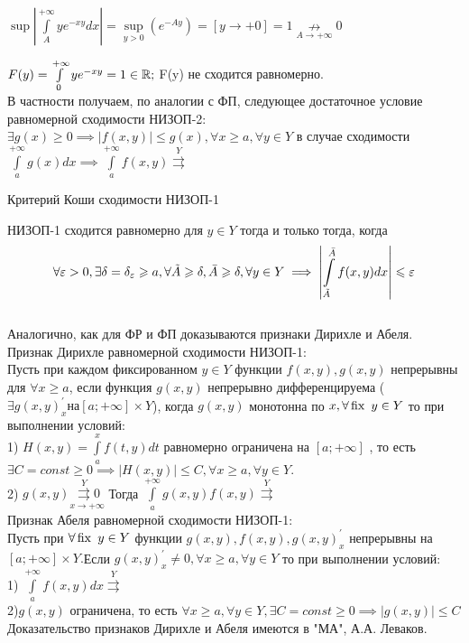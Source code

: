 \documentclass[a4paper,12pt,openany]{report}
\begin{document}
$\sup\left| \int\limits_A^{+\infty}ye^{-xy}dx \right|=\underset{y > 0}\sup  
\left( e^{-Ay}\right) = \left[y \to +0\right] = 1 \underset{A \to 
+\infty}\nrightarrow 0 $	

$F(y) = \int\limits_0^{+\infty}ye^{-xy} = 1 \in \mathbb{R};$ F(y) не сходится 
равномерно.
\\
В частности получаем, по аналогии с ФП, следующее достаточное условие 
равномерной сходимости НИЗОП-2:
$\exists g(x) \ge 0 \implies \left| f(x,y) \right| \le g(x), \forall x \ge a, 
\forall y \in Y $ в случае сходимости $\int\limits_a^{+\infty}g(x)dx \implies 
\int\limits_a^{+\infty}f(x,y) \overset{Y}\rightrightarrows $
\begin{crl*}Критерий Коши сходимости НИЗОП-1\end{crl*}

НИЗОП-1 сходится равномерно для $ y \in Y$ тогда и только тогда, 
когда\begin{equation}\label{lec10:11} \forall \varepsilon > 0, \exists \delta = 
\delta_\varepsilon \geqslant a, \forall \tilde{A} \geqslant \delta, \bar{A} \geqslant \delta, \forall y 
\in Y \implies \left| \int\limits_{\tilde{A}}^{\bar{A}}f(x,y)dx \right| \leqslant 
\varepsilon \end{equation}
\\
Аналогично, как для ФР и ФП доказываются признаки Дирихле и Абеля.
\\
Признак Дирихле равномерной сходимости НИЗОП-1:
\\
Пусть при каждом фиксированном $y \in Y$ функции $f(x,y),g(x,y)$ непрерывны 
для $\forall x \ge a$, если функция $g(x,y)$ непрерывно дифференцируема 
($\exists g(x,y)_x^\prime на [a;+\infty] \times Y $), когда $g(x,y)$ 
монотонна по $x, \forall \operatorname{fix} \ y \in Y$ то при выполнении условий:
\\
1) $H(x,y) = \int\limits_a^x f(t,y)dt$ равномерно ограничена на $[a;+\infty]$ 
, то  есть $\exists C = const \ge 0 \implies \left|H(x,y)\right| \le C, 
\forall x \ge a, \forall y \in Y.$
\\
2) $g(x,y)\underset{x \to +\infty}{\overset{Y}{\rightrightarrows} 0}$
Тогда $\int\limits_a^{+\infty} g(x,y)f(x,y) \overset{Y}{\rightrightarrows}$
\\
Признак Абеля равномерной сходимости НИЗОП-1:
\\
Пусть при $\forall \operatorname{fix} \ y \in Y $ функции $g(x,y), f(x,y), g(x,y)_x^\prime$ 
непрерывны на $[a;+\infty]\times Y.$Если $ g(x,y)_x^\prime \not = 0, \forall x 
\ge a, \forall y \in Y $ то при выполнении условий:
\\
1) $\int\limits_a^{+\infty}f(x,y)dx \overset{Y}{\rightrightarrows}$
\\
2)$g(x,y)$ ограничена, то есть $\forall x \ge a, \forall y \in Y, \exists C = 
const \ge 0 \implies \left|g(x,y)\right| \le C $
\\
Доказательство признаков Дирихле и Абеля имеются в "МА", А.А. Леваков.
\\
\\
\\
\end{document}
